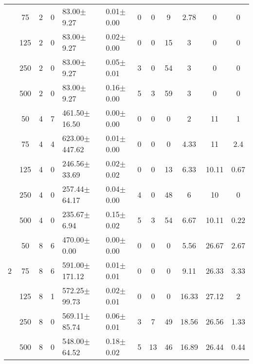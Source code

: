\documentclass[12pt]{article}
\begin{document}
\begin{table}[h]
\begin{center}
\begin{tabular}{c c c c l l c c c c c c}
 &75      &  2   &    0  &  83.00$\pm$9.27      &        0.01$\pm$0.00  &  0  &          0   &            9   &         2.78    &       0       &  0       \\
 &125     &  2   &    0  &  83.00$\pm$9.27      &        0.02$\pm$0.00  &  0  &          0   &            15  &         3       &       0       &  0       \\
 &250     &  2   &    0  &  83.00$\pm$9.27      &        0.05$\pm$0.01  &  3  &          0   &            54  &         3       &       0       &  0       \\
 &500     &  2   &    0  &  83.00$\pm$9.27      &        0.16$\pm$0.00  &  5  &          3   &            59  &         3       &       0       &  0       \\
 &50      &  4   &    7  &  461.50$\pm$16.50    &        0.00$\pm$0.00  &  0  &          0   &            0   &         2       &       11      &  1       \\
 &75      &  4   &    4  &  623.00$\pm$447.62   &        0.01$\pm$0.00  &  0  &          0   &            0   &         4.33    &       11      &  2.4     \\
 &125     &  4   &    0  &  246.56$\pm$33.69    &        0.02$\pm$0.02  &  0  &          0   &            13  &         6.33    &       10.11   &  0.67    \\
 &250     &  4   &    0  &  257.44$\pm$64.17    &        0.04$\pm$0.00  &  4  &          0   &            48  &         6       &       10      &  0       \\
 &500     &  4   &    0  &  235.67$\pm$6.94     &        0.15$\pm$0.02  &  5  &          3   &            54  &         6.67    &       10.11   &  0.22    \\
 &50      &  8   &    6  &  470.00$\pm$0.00     &        0.00$\pm$0.00  &  0  &          0   &            0   &         5.56    &       26.67   &  2.67    \\
2&75      &  8   &    6  &  591.00$\pm$171.12   &        0.01$\pm$0.01  &  0  &          0   &            0   &         9.11    &       26.33   &  3.33    \\
 &125     &  8   &    1  &  572.25$\pm$99.73    &        0.02$\pm$0.01  &  0  &          0   &            0   &         16.33   &       27.12   &  2       \\
 &250     &  8   &    0  &  569.11$\pm$85.74    &        0.06$\pm$0.01  &  3  &          7   &            49  &         18.56   &       26.56   &  1.33    \\
 &500     &  8   &    0  &  548.00$\pm$64.52    &        0.18$\pm$0.02  &  5  &          13  &            46  &         16.89   &       26.44   &  0.44    \\

\end{tabular}
\end{center}
\end{table}
\end{document}
